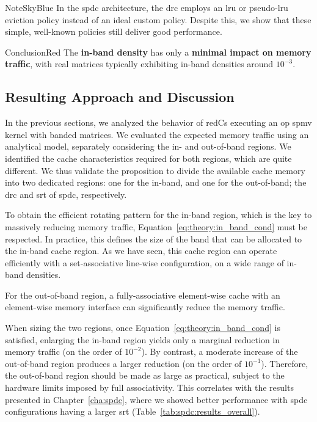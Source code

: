 \begin{highlight}{Note}{SkyBlue}
    In the \acrlong{spdc} architecture, the \acrshort{drc} employs an \acrshort{lru} or pseudo-\acrshort{lru} eviction policy instead of an ideal custom policy.
    Despite this, we show that these simple, well-known policies still deliver good performance.
\end{highlight}

\begin{highlight}{Conclusion}{Red}
    The \textbf{in-\gls{band} density} has only a \textbf{minimal impact on memory traffic}, with real matrices typically exhibiting in-\gls{band} densities around $10^{-3}$.
\end{highlight}

\subsection{Resulting Approach and Discussion}
\label{sec:theory:theory_conclu}

In the previous sections, we analyzed the behavior of \glspl{redC} executing an \acrshort{op} \acrshort{spmv} kernel with \gls{banded} matrices.
We evaluated the expected memory traffic using an analytical model, separately considering the in- and out-of-\gls{band} regions.
We identified the cache characteristics required for both regions, which are quite different.
We thus validate the proposition to divide the available cache memory into two dedicated regions: one for the in-\gls{band}, and one for the out-of-\gls{band}; the \acrshort{drc} and \acrshort{srt} of \acrlong{spdc}, respectively.

To obtain the efficient rotating pattern for the in-\gls{band} region, which is the key to massively reducing memory traffic, Equation~\ref{eq:theory:in_band_cond} must be respected.
In practice, this defines the size of the \gls{band} that can be allocated to the in-\gls{band} cache region.
As we have seen, this cache region can operate efficiently with a \gls{set}-associative line-wise configuration, on a wide range of in-\gls{band} densities.

For the out-of-\gls{band} region, a fully-associative element-wise cache with an element-wise memory interface can significantly reduce the memory traffic.

When sizing the two regions, once Equation~\ref{eq:theory:in_band_cond} is satisfied, enlarging the in-\gls{band} region yields only a marginal reduction in memory traffic (on the order of $10^{-2}$).
By contrast, a moderate increase of the out-of-\gls{band} region produces a larger reduction (on the order of $10^{-1}$).
Therefore, the out-of-\gls{band} region should be made as large as practical, subject to the hardware limits imposed by full associativity.
This correlates with the results presented in Chapter~\ref{cha:spdc}, where we showed better performance with \acrlong{spdc} configurations having a larger \acrshort{srt} (Table~\ref{tab:spdc:results_overall}).

